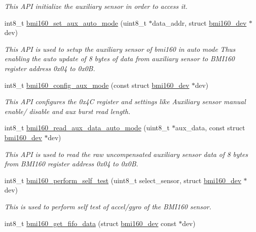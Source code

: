 \begin{DoxyCompactItemize}
\begin{DoxyCompactList}\small\item\em This A\+PI initialize the auxiliary sensor in order to access it. \end{DoxyCompactList}\item 
int8\+\_\+t \hyperlink{group__bmi160_gae2a0b717765bc2ee40c0fb92d2f819d2}{bmi160\+\_\+set\+\_\+aux\+\_\+auto\+\_\+mode} (uint8\+\_\+t $\ast$data\+\_\+addr, struct \hyperlink{structbmi160__dev}{bmi160\+\_\+dev} $\ast$dev)
\begin{DoxyCompactList}\small\item\em This A\+PI is used to setup the auxiliary sensor of bmi160 in auto mode Thus enabling the auto update of 8 bytes of data from auxiliary sensor to B\+M\+I160 register address 0x04 to 0x0B. \end{DoxyCompactList}\item 
int8\+\_\+t \hyperlink{group__bmi160_ga1a57c45da550b97a5361e84b12f2d2a4}{bmi160\+\_\+config\+\_\+aux\+\_\+mode} (const struct \hyperlink{structbmi160__dev}{bmi160\+\_\+dev} $\ast$dev)
\begin{DoxyCompactList}\small\item\em This A\+PI configures the 0x4C register and settings like Auxiliary sensor manual enable/ disable and aux burst read length. \end{DoxyCompactList}\item 
int8\+\_\+t \hyperlink{group__bmi160_gae1f173b8b1e4ba2601016cc5fe8edc29}{bmi160\+\_\+read\+\_\+aux\+\_\+data\+\_\+auto\+\_\+mode} (uint8\+\_\+t $\ast$aux\+\_\+data, const struct \hyperlink{structbmi160__dev}{bmi160\+\_\+dev} $\ast$dev)
\begin{DoxyCompactList}\small\item\em This A\+PI is used to read the raw uncompensated auxiliary sensor data of 8 bytes from B\+M\+I160 register address 0x04 to 0x0B. \end{DoxyCompactList}\item 
int8\+\_\+t \hyperlink{group__bmi160_ga6f83dc85a8173886ffe58e381fd9e0b8}{bmi160\+\_\+perform\+\_\+self\+\_\+test} (uint8\+\_\+t select\+\_\+sensor, struct \hyperlink{structbmi160__dev}{bmi160\+\_\+dev} $\ast$dev)
\begin{DoxyCompactList}\small\item\em This is used to perform self test of accel/gyro of the B\+M\+I160 sensor. \end{DoxyCompactList}\item 
int8\+\_\+t \hyperlink{group__bmi160_gac37108690acb5072d5c19a0f4e677634}{bmi160\+\_\+get\+\_\+fifo\+\_\+data} (struct \hyperlink{structbmi160__dev}{bmi160\+\_\+dev} const $\ast$dev)

\end{DoxyCompactItemize}
